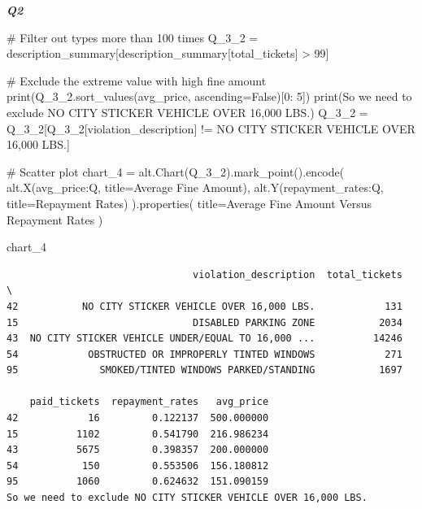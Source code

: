 \documentclass[
  letterpaper,
  DIV=11,
  numbers=noendperiod]{scrartcl}
\newenvironment{Shaded}{\begin{snugshade}}{\end{snugshade}}
\newcommand{\BuiltInTok}[1]{\textcolor[rgb]{0.00,0.23,0.31}{#1}}
\newcommand{\CommentTok}[1]{\textcolor[rgb]{0.37,0.37,0.37}{#1}}
\newcommand{\DecValTok}[1]{\textcolor[rgb]{0.68,0.00,0.00}{#1}}
\newcommand{\NormalTok}[1]{\textcolor[rgb]{0.00,0.23,0.31}{#1}}
\newcommand{\OperatorTok}[1]{\textcolor[rgb]{0.37,0.37,0.37}{#1}}
\newcommand{\StringTok}[1]{\textcolor[rgb]{0.13,0.47,0.30}{#1}}
\newcommand{\VariableTok}[1]{\textcolor[rgb]{0.07,0.07,0.07}{#1}}
\begin{document}
\textbf{\emph{Q2}}

\begin{Shaded}
\begin{Highlighting}[]
\CommentTok{\# Filter out types more than 100 times }
\NormalTok{Q\_3\_2 }\OperatorTok{=}\NormalTok{ description\_summary[description\_summary[}\StringTok{\textquotesingle{}total\_tickets\textquotesingle{}}\NormalTok{] }\OperatorTok{\textgreater{}} \DecValTok{99}\NormalTok{]}

\CommentTok{\# Exclude the extreme value with high fine amount}
\BuiltInTok{print}\NormalTok{(Q\_3\_2.sort\_values(}\StringTok{\textquotesingle{}avg\_price\textquotesingle{}}\NormalTok{, ascending}\OperatorTok{=}\VariableTok{False}\NormalTok{)[}\DecValTok{0}\NormalTok{: }\DecValTok{5}\NormalTok{])}
\BuiltInTok{print}\NormalTok{(}\StringTok{\textquotesingle{}So we need to exclude NO CITY STICKER VEHICLE OVER 16,000 LBS.\textquotesingle{}}\NormalTok{)}
\NormalTok{Q\_3\_2 }\OperatorTok{=}\NormalTok{ Q\_3\_2[Q\_3\_2[}\StringTok{\textquotesingle{}violation\_description\textquotesingle{}}\NormalTok{] }\OperatorTok{!=} \StringTok{\textquotesingle{}NO CITY STICKER VEHICLE OVER 16,000 LBS.\textquotesingle{}}\NormalTok{]}

\CommentTok{\# Scatter plot}
\NormalTok{chart\_4 }\OperatorTok{=}\NormalTok{ alt.Chart(Q\_3\_2).mark\_point().encode(}
\NormalTok{    alt.X(}\StringTok{\textquotesingle{}avg\_price:Q\textquotesingle{}}\NormalTok{, title}\OperatorTok{=}\StringTok{\textquotesingle{}Average Fine Amount\textquotesingle{}}\NormalTok{),}
\NormalTok{    alt.Y(}\StringTok{\textquotesingle{}repayment\_rates:Q\textquotesingle{}}\NormalTok{, title}\OperatorTok{=}\StringTok{\textquotesingle{}Repayment Rates\textquotesingle{}}\NormalTok{)}
\NormalTok{).properties(}
\NormalTok{    title}\OperatorTok{=}\StringTok{\textquotesingle{}Average Fine Amount Versus Repayment Rates\textquotesingle{}}
\NormalTok{)}

\NormalTok{chart\_4}
\end{Highlighting}
\end{Shaded}

\begin{verbatim}
                                violation_description  total_tickets  \
42           NO CITY STICKER VEHICLE OVER 16,000 LBS.            131   
15                              DISABLED PARKING ZONE           2034   
43  NO CITY STICKER VEHICLE UNDER/EQUAL TO 16,000 ...          14246   
54            OBSTRUCTED OR IMPROPERLY TINTED WINDOWS            271   
95              SMOKED/TINTED WINDOWS PARKED/STANDING           1697   

    paid_tickets  repayment_rates   avg_price  
42            16         0.122137  500.000000  
15          1102         0.541790  216.986234  
43          5675         0.398357  200.000000  
54           150         0.553506  156.180812  
95          1060         0.624632  151.090159  
So we need to exclude NO CITY STICKER VEHICLE OVER 16,000 LBS.
\end{verbatim}
\end{document}
